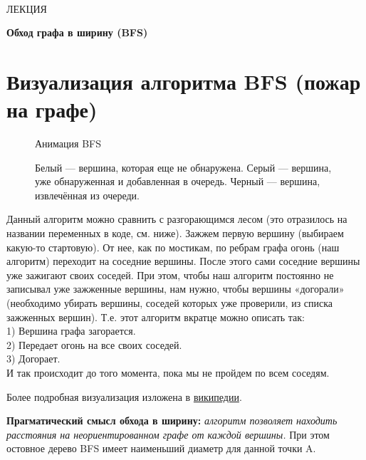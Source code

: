 \documentclass[a4paper,12pt]{article}
\theoremstyle{plain} %
\theoremstyle{definition} %
\theoremstyle{remark} %
\begin{document}
\newcommand{\lec}[1]{\addtocounter{lec}{1} \setcounter{section}{0}%
\begin{center}
{\LARGE ЛЕКЦИЯ %
\vspace{2mm}%

\textbf{#1}%
}
\end{center}
}
\newpage
\
\setcounter{lec}{3}
\lec{Обход графа в ширину (BFS)}
\section{Визуализация алгоритма BFS (пожар на графе)}
\begin{wrapfigure}{r}{0.4\linewidth}
\begin{frame}{Анимация BFS}
\end{frame}
\caption{Белый — вершина, которая еще не обнаружена. Серый — вершина, уже обнаруженная и добавленная в очередь. Черный — вершина, извлечённая из очереди.}
\vspace{-0.7cm}
\end{wrapfigure}

Данный алгоритм можно сравнить с разгорающимся лесом (это отразилось на названии переменных в коде, см. ниже). Зажжем первую вершину (выбираем какую-то стартовую). От нее, как по мостикам, по ребрам графа огонь (наш алгоритм) переходит на соседние вершины. После этого сами соседние вершины уже зажигают своих соседей. При этом, чтобы наш алгоритм постоянно не записывал уже зажженные вершины, нам нужно, чтобы вершины «догорали» (необходимо убирать вершины, соседей которых уже проверили, из списка зажженных вершин). Т.е. этот алгоритм вкратце можно описать так:\\
1) Вершина графа загорается.\\
2) Передает огонь на все своих соседей.\\
3) Догорает.\\
И так происходит до того момента, пока мы не пройдем по всем соседям.


Более подробная визуализация изложена в \href{https://ru.wikipedia.org/wiki/%D0%9F%D0%BE%D0%B8%D1%81%D0%BA_%D0%B2_%D1%88%D0%B8%D1%80%D0%B8%D0%BD%D1%83}{википедии}.

\textbf{Прагматический смысл обхода в ширину:} \textit{алгоритм позволяет находить расстояния на неориентированном графе от каждой вершины.}  При этом остовное дерево BFS имеет наименьший диаметр для данной точки A.
\end{document}
